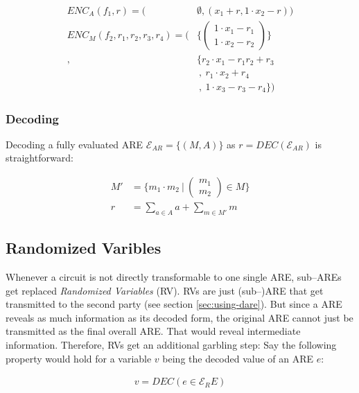 \documentclass[12pt, a4paper]{article}
\begin{document}
\begin{align*}
ENC_A(f_1, r) = \Big( & \emptyset, (x_1 + r, 1 \cdot x_2 - r)\Big) \\
ENC_M(f_2,  r_1, r_2, r_3, r_4) = \Bigg( & \bigg\{
\begin{pmatrix}1 \cdot x_1 - r_1\\1 \cdot x_2 - r_2\end{pmatrix} \bigg\}\\
,& \bigg\{r_2 \cdot x_1 -r_1r_2+r_3 \\
&\ ,\ r_1 \cdot x_2 + r_4 \\
&\ ,\ 1 \cdot x_3-r_3-r_4\bigg\} \Bigg)
\end{align*}


\subsubsection{Decoding}
\label{sec:affinization_decoding}

Decoding a fully evaluated ARE $\mathcal{E}_{AR} = \{(M,A)\}$ as $r =
DEC(\mathcal{E}_{AR})$ is
straightforward:

\begin{align}
M' &= \Bigg\{ m_1 \cdot m_2\ \Bigg|\ \begin{pmatrix}m_1\\m_2\end{pmatrix}
\in M \Bigg\} \\
r & = \sum_{a \in A} a + \sum_{m \in M'} m
\end{align}


\subsection{Randomized Varibles}
\label{sec:randomized-variables}

Whenever a circuit is not directly transformable to one single ARE, sub--AREs
get replaced \emph{Randomized Variables} (RV). RVs are just (sub--)ARE that get
transmitted to the second party (see section \ref{sec:using-dare}). But since a
ARE reveals as much information as its decoded form, the original ARE cannot
just be transmitted as the final overall ARE. That would reveal intermediate
information. Therefore, RVs get an additional garbling step: Say the following
property would hold for a variable $v$ being the decoded value of an ARE $e$:

\begin{align}
v = DEC(e \in \mathcal{E}_RE)
\end{align}
\end{document}
